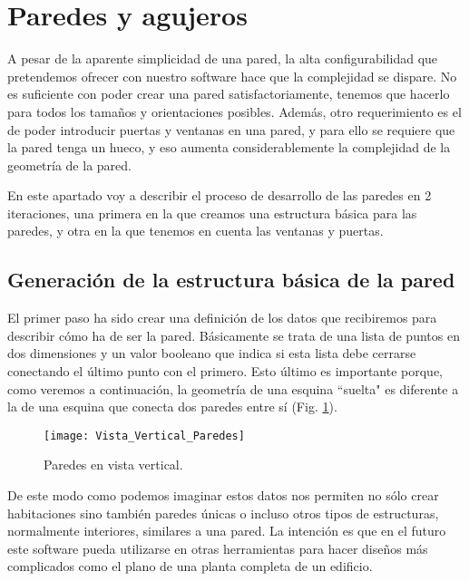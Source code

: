 \section{Paredes y agujeros}
\label{walls_holes}
A pesar de la aparente simplicidad de una pared, la alta configurabilidad que pretendemos ofrecer con nuestro software hace que la complejidad se dispare. No es suficiente con poder crear una pared satisfactoriamente, tenemos que hacerlo para todos los tamaños y orientaciones posibles. Además, otro requerimiento es el de poder introducir puertas y ventanas en una pared, y para ello se requiere que la pared tenga un hueco, y eso aumenta considerablemente la complejidad de la geometría de la pared.

En este apartado voy a describir el proceso de desarrollo de las paredes en 2 iteraciones, una primera en la que creamos una estructura básica para las paredes, y otra en la que tenemos en cuenta las ventanas y puertas.

\subsection{Generación de la estructura básica de la pared}
\label{subsec:gen1}
El primer paso ha sido crear una definición de los datos que recibiremos para describir cómo ha de ser la pared. Básicamente se trata de una lista de puntos en dos dimensiones y un valor booleano que indica si esta lista debe cerrarse conectando el último punto con el primero. Esto último es importante porque, como veremos a continuación, la geometría de una esquina ``suelta" es diferente a la de una esquina que conecta dos paredes entre sí (Fig. \ref{fig:vertical_view_walls}).

\begin{figure}[h]
    \centering
    \texttt{[image: Vista\_Vertical\_Paredes]}
    \caption{Paredes en vista vertical.}
    \label{fig:vertical_view_walls}
\end{figure}

De este modo como podemos imaginar estos datos nos permiten no sólo crear habitaciones sino también paredes únicas o incluso otros tipos de estructuras, normalmente interiores, similares a una pared. La intención es que en el futuro este software pueda utilizarse en otras herramientas para hacer diseños más complicados como el plano de una planta completa de un edificio.

